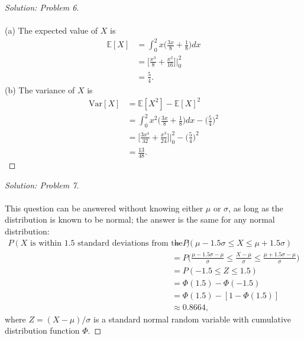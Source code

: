 \documentclass[10pt]{article}
\begin{document}
\vspace{0.2cm}
\begin{proof}[Solution: Problem 6]
\text{}\\
\text{}\\
(a)
The expected value of $X$ is
\begin{align*}
\mathbb{E}[X] &= \int_0^2 x \bigg(\frac{3x}{8} + \frac{1}{8}\bigg)dx\\
&= \bigg[\frac{x^3}{8} + \frac{x^2}{16}\bigg]\bigg|^2_0\\
&= \frac{5}{4}.
\end{align*}
(b) The variance of $X$ is
\begin{align*}
\mathrm{Var}[X] &= \mathbb{E}[X^2] - \mathbb{E}[X]^2\\
&= \int_0^2 x^2 \bigg(\frac{3x}{8} + \frac{1}{8}\bigg)dx - \bigg(\frac{5}{4}\bigg)^2\\
&= \bigg[\frac{3x^4}{32} + \frac{x^3}{24}\bigg]\bigg|^2_0 - \bigg(\frac{5}{4}\bigg)^2\\
&= \frac{13}{48}.
\end{align*}
\end{proof}

\begin{proof}[Solution: Problem 7]
\text{}\\
\text{}\\
This question can be answered without knowing either $\mu$ or $\sigma$, as long as the distribution is known to be normal; the answer is the same for any normal distribution:
\begin{align*}
P(\text{$X$ is within 1.5 standard deviations from the mean}) &= P(\mu - 1.5 \sigma \leq X \leq \mu + 1.5 \sigma)\\
&= P\bigg(\frac{\mu - 1.5 \sigma - \mu}{\sigma} \leq \frac{X - \mu}{\sigma} \leq \frac{\mu + 1.5 \sigma  - \mu}{\sigma}\bigg)\\
&= P(- 1.5  \leq Z \leq 1.5)\\
&= \Phi(1.5) -  \Phi(-1.5)\\
&= \Phi(1.5) -  [1 - \Phi(1.5)]\\
&\approx 0.8664,
\end{align*}
where $Z = (X - \mu)/\sigma$ is a standard normal random variable with cumulative distribution function $\Phi$.
\end{proof}
\end{document}
